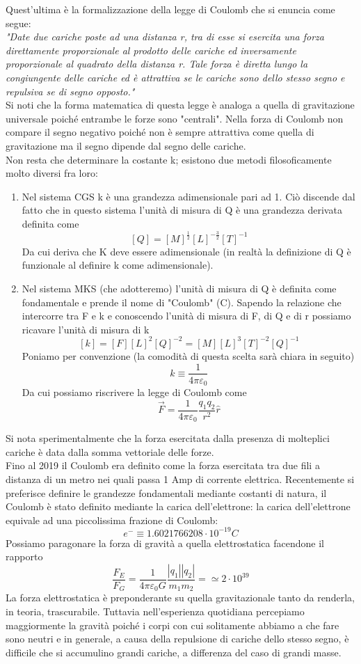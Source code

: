 \documentclass[10pt,a4paper]{article}
\begin{document}
Quest'ultima è la formalizzazione della legge di Coulomb che si enuncia come segue:\\
\textit{"Date due cariche poste ad una distanza r, tra di esse si esercita una forza direttamente proporzionale al prodotto delle cariche ed inversamente proporzionale al quadrato della distanza r. Tale forza è diretta lungo la congiungente delle cariche ed è attrattiva se le cariche sono dello stesso segno e repulsiva se di segno opposto."}\\
Si noti che la forma matematica di questa legge è analoga a quella di gravitazione universale poiché entrambe le forze sono "centrali". Nella forza di Coulomb non compare il segno negativo poiché non è sempre attrattiva come quella di gravitazione ma il segno dipende dal segno delle cariche.\\
Non resta che determinare la costante k; esistono due metodi filosoficamente molto diversi fra loro:
\begin{enumerate}
	\item Nel sistema CGS  k è una grandezza adimensionale pari ad 1. Ciò discende dal fatto che in questo sistema l'unità di misura di Q è una grandezza derivata definita come
	\[[Q] = [M]^{\frac{1}{2}}[L]^{-\frac{3}{2}}[T]^{-1}\]
	Da cui deriva che K deve essere adimensionale (in realtà la definizione di Q è funzionale al definire k come adimensionale).
	\item Nel sistema MKS (che adotteremo) l'unità di misura di Q è definita come fondamentale e prende il nome di "Coulomb" (C). Sapendo la relazione che intercorre tra F e k e conoscendo l'unità di misura di F, di Q e di r possiamo ricavare l'unità di misura di k
	\[[k] = [F][L]^2[Q]^{-2} = [M][L]^3[T]^{-2}[Q]^{-1}\]
	Poniamo per convenzione (la comodità di questa scelta sarà chiara in seguito)
	\[k \equiv \frac{1}{4\pi\varepsilon_0}\]
	Da cui possiamo riscrivere la legge di Coulomb come
	\[\vec{F} = \frac{1}{4\pi\varepsilon_0}\frac{q_1q_2}{r^2}\hat{r}\]
\end{enumerate}
Si nota sperimentalmente che la forza esercitata dalla presenza di molteplici cariche è data dalla somma vettoriale delle forze.\\
Fino al 2019 il Coulomb era definito come la forza esercitata tra due fili a distanza di un metro nei quali passa 1 Amp di corrente elettrica. Recentemente si preferisce definire le grandezze fondamentali mediante costanti di natura, il Coulomb è stato definito mediante la carica dell'elettrone: la carica dell'elettrone equivale ad una piccolissima frazione di Coulomb: 
\[e^- \equiv 1.6021766208\cdot10^{-19} C\]
Possiamo paragonare la forza di gravità a quella elettrostatica facendone il rapporto
\[\frac{F_E}{F_G} = \frac{1}{4\pi\varepsilon_0 G}\frac{|q_1||q_2|}{m_1m_2}=\simeq 2\cdot10^{39}\]
La forza elettrostatica è preponderante su quella gravitazionale tanto da renderla, in teoria, trascurabile. Tuttavia nell'esperienza quotidiana percepiamo maggiormente la gravità poiché i corpi con cui solitamente abbiamo a che fare sono neutri e in generale, a causa della repulsione di cariche dello stesso segno, è difficile che si accumulino grandi cariche, a differenza del caso di grandi masse.
\end{document}
